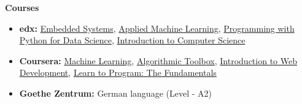 \documentclass[letterpaper,10pt]{article}
\newcommand{\resheading}[1]{{\large \colorbox{mygrey}{\begin{minipage}{\textwidth}{\textbf{#1 \vphantom{p\^{E}}}}\end{minipage}}}}
\begin{document}
\resheading{Courses}
    \begin{itemize}
        \item \textbf{edx:}
        \href{https://www.edx.org/course/embedded-systems-shape-world-utaustinx-ut-6-03x} {Embedded Systems},
        \href{https://courses.edx.org/courses/course-v1:Microsoft+DAT203.3x+5T2016/info}{Applied Machine Learning},
        \href{https://courses.edx.org/courses/course-v1:Microsoft+DAT210x+6T2016/info}{Programming with Python for Data Science},
        \href{https://www.edx.org/course/introduction-computer-science-harvardx-cs50x}{Introduction to Computer Science}
        \item \textbf{Coursera:}                            \href{https://www.coursera.org/learn/machine-learning}{Machine Learning},
        \href{https://www.coursera.org/learn/algorithmic-toolbox/home/welcome}{Algorithmic Toolbox},
        \href{https://www.coursera.org/learn/web-development/home/welcome}{Introduction to Web Development},
        \href{https://www.coursera.org/learn/learn-to-program}{Learn to Program: The Fundamentals}
        \item \textbf{Goethe Zentrum:} German language (Level - A2)
    \end{itemize}
    
\end{document}
